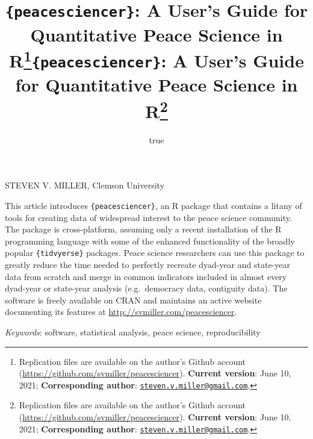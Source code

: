 \documentclass[
  11pt,
]{article}
\title{\texttt{\{peacesciencer\}}: A User's Guide for Quantitative Peace Science in R\thanks{Replication files are available on the author's Github account (\url{https://github.com/svmiller/peacesciencer}). \textbf{Current version}: June 10, 2021; \textbf{Corresponding author}: \href{mailto:steven.v.miller@gmail.com}{\nolinkurl{steven.v.miller@gmail.com}}.}}
\author{true}
\date{}
\title{\texttt{\{peacesciencer\}}: A User's Guide for Quantitative Peace Science in R\thanks{Replication files are available on the author's Github account (\url{https://github.com/svmiller/peacesciencer}). \textbf{Current version}: June 10, 2021; \textbf{Corresponding author}: \href{mailto:steven.v.miller@gmail.com}{\nolinkurl{steven.v.miller@gmail.com}}.}  }
\date{}
\renewenvironment{abstract}
 {{%
    \setlength{\leftmargin}{0mm}
    \setlength{\rightmargin}{\leftmargin}%
  }%
  \relax}
 {\endlist}
\begin{document}



{%
\setlength{\parindent}{0pt}
\thispagestyle{plain}
{%
\maketitle  %

}




{
   \vskip 13.5pt\relax \normalsize\fontsize{11}{12}
   \MakeUppercase{Steven V. Miller}, \small{Clemson University}   

}

}








\begin{abstract}


    \vskip 8.5pt %

\noindent \small{This article introduces \texttt{\{peacesciencer\}}, an R package that contains a litany of tools for creating data of widespread interest to the peace science community. The package is cross-platform, assuming only a recent installation of the R programming language with some of the enhanced functionality of the broadly popular \texttt{\{tidvyerse\}} packages. Peace science researchers can use this package to greatly reduce the time needed to perfectly recreate dyad-year and state-year data from scratch and merge in common indicators included in almost every dyad-year or state-year analysis (e.g.~democracy data, contiguity data). The software is freely available on CRAN and maintains an active website documenting its features at \url{http://svmiller.com/peacesciencer}.}


\vskip 8.5pt \noindent \emph{Keywords}: software, statistical analysis, peace science, reproducibility \par




\end{abstract}
\end{document}
